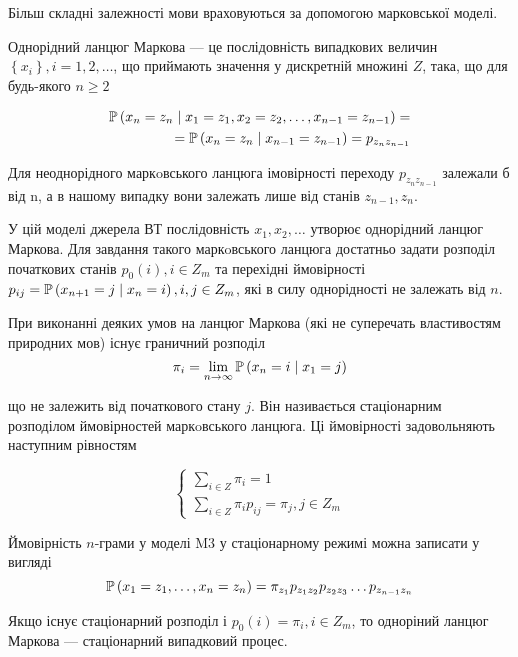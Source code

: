 Більш складні залежності мови враховуються за допомогою марковської моделі.

\begin{definition}
    Однорідний ланцюг Маркова --- це послідовність випадкових величин
    $\left\{ x_i \right\}, i=1,2,\dots$, що 
    приймають значення у дискретній множині $Z$, така,
    що для будь-якого $n \geq 2$ 

    \begin{align*}
        \mathbb{P}\left( x_n=z_n \mid x_1=z_1, x_2=z_2, \dots, x_{n-1}=z_{n-1} \right) = \\
            = \mathbb{P}\left( x_n=z_n \mid x_{n-1}=z_{n-1} \right)
            = p_{z_n z_{n-1}}
    \end{align*}

    Для неоднорідного маркoвського ланцюга імовірності переходу 
    $p_{z_n z_{n-1}}$ залежали б від n, а в нашому випадку вони залежать
    лише від станів $z_{n-1}, z_n$.

\end{definition}

\begin{definition}[Модель M3]
    У цій моделі джерела ВТ послідовність $x_1, x_2, \dots$
    утворює однорідний ланцюг Маркова.
    Для завдання такого маркoвського ланцюга достатньо задати
    розподіл початкових станів  $p_0\left( i \right), i \in Z_m$
    та перехідні ймовірності
    $p_{ij}=\mathbb{P}\left( x_{n+1}=j \mid x_n=i \right), i, j\in Z_m$,
    які в силу однорідності не залежать від  $n$.
    
    При виконанні деяких умов на ланцюг Маркова (які не суперечать  властивостям
    природних мов) існує граничний розподіл
    $$\pi_i=\lim_{n \to \infty} \mathbb{P}\left( x_n=i \mid x_1=j \right)$$

    що не залежить від початкового стану  $j$. Він називається стаціонарним
    розподілом ймовірностей маркoвського ланцюга. Ці ймовірності задовольняють
    наступним рівностям

    $$\begin{cases}
        \sum_{i \in Z} \pi_i = 1 \\
        \sum_{i \in Z} \pi_i p_{ij} = \pi_j, j \in Z_m
    \end{cases}$$

    Ймовірність $n$-грами у моделі M3 у стаціонарному режимі
    можна записати у вигляді
    $$\mathbb{P}\left( x_1=z_1, \dots, x_n=z_n \right)
        = \pi_{z_1} p_{z_1 z_2} p_{z_2 z_3} \dots p_{z_{n-1} z_n}$$
\end{definition}

Якщо існує стаціонарний розподіл  і $p_0\left( i \right) = \pi_i, i \in Z_m$,
то одноріний ланцюг Маркова --- стаціонарний випадковий процес.

